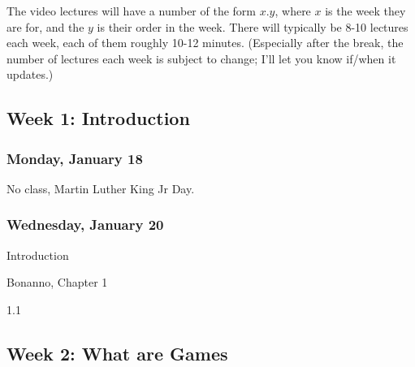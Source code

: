\documentclass[
]{article}
\providecommand{\tightlist}{%
  \setlength{\itemsep}{0pt}\setlength{\parskip}{0pt}}
\begin{document}
The video lectures will have a number of the form \(x.y\), where \(x\)
is the week they are for, and the \(y\) is their order in the week.
There will typically be 8-10 lectures each week, each of them roughly
10-12 minutes. (Especially after the break, the number of lectures each
week is subject to change; I'll let you know if/when it updates.)

\hypertarget{week-1-introduction}{%
\subsection{Week 1: Introduction}\label{week-1-introduction}}

\begin{multicols}{2}

\hypertarget{monday-january-18}{%
\subsubsection{Monday, January 18}\label{monday-january-18}}

No class, Martin Luther King Jr Day.

\columnbreak

\hypertarget{wednesday-january-20}{%
\subsubsection{Wednesday, January 20}\label{wednesday-january-20}}

\begin{description}
\tightlist
\item[Topic]
Introduction
\item[Reading]
Bonanno, Chapter 1
\item[Lectures]
1.1
\end{description}

\end{multicols}

\hypertarget{week-2-what-are-games}{%
\subsection{Week 2: What are Games}\label{week-2-what-are-games}}
\end{document}
